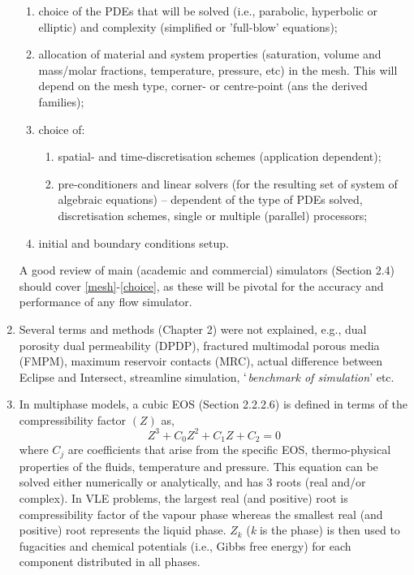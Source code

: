 \documentclass[14pt,twoside]{report}
\begin{document}
\begin{enumerate}
\begin{enumerate}
\item \label{pde}choice of the PDEs that will be solved (i.e., parabolic, hyperbolic or elliptic) and complexity (simplified or 'full-blow' equations);
\item \label{allocation}allocation of material and system properties (saturation, volume and mass/molar fractions, temperature, pressure, etc) in the mesh. This will depend on the mesh type, corner- or centre-point (ans the derived families);
\item \label{choice}choice of:
\begin{enumerate}
\item \label{disc}spatial- and time-discretisation schemes (application dependent);
\item \label{solver}pre-conditioners and linear solvers (for the resulting set of system of algebraic equations) -- dependent of the type of PDEs solved, discretisation schemes, single or multiple (parallel) processors;
\end{enumerate}
\item initial and boundary conditions setup.
\end{enumerate}
A good review of main (academic and commercial) simulators (Section 2.4) should cover \ref{mesh}-\ref{choice}, as these will be pivotal for the accuracy and performance of any flow simulator.
%
\item Several terms and methods (Chapter 2) were not explained, e.g., dual porosity dual permeability (DPDP), fractured multimodal porous media (FMPM), maximum reservoir contacts (MRC), actual difference between Eclipse and Intersect, streamline simulation, $\lq${\it benchmark of simulation}' etc.
%
\item In multiphase models, a cubic EOS (Section 2.2.2.6) is defined in terms of the  compressibility factor $\left(Z\right)$ as,
\begin{displaymath}
Z^{3}+C_{0}Z^{2}+C_{1}Z+C_{2}=0
\end{displaymath}
where $C_{j}$ are coefficients that arise from the specific EOS, thermo-physical properties of the fluids, temperature and pressure. This equation can be solved either numerically or analytically, and has 3 roots (real and/or complex). In VLE problems, the largest real (and positive) root is compressibility factor of the vapour phase whereas the smallest real (and positive) root represents the liquid phase. $Z_{k}$ ({\it k} is the phase) is then used to fugacities and chemical potentials (i.e., Gibbs free energy) for each component distributed in all phases. 

\end{enumerate}
\end{document}
